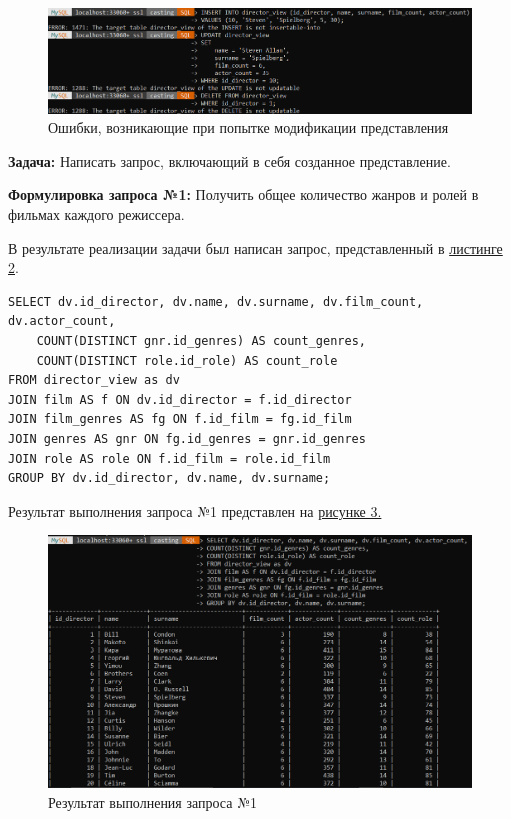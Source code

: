 \documentclass[11pt,a4paper,final]{article} %
\begin{document}
\begin{figure}[H]
	\centering
	\includegraphics[width=0.9\linewidth]{pic2.png}
	\caption{Ошибки, возникающие при попытке модификации представления}
	\label{fig:pic2}
\end{figure}

\textbf{Задача:} Написать запрос, включающий в себя созданное представление.

\textbf{Формулировка запроса №1:} Получить общее количество жанров и ролей в фильмах каждого режиссера.

\par В результате реализации задачи был написан запрос, представленный в \hyperref[lst:l2]{листинге 2}.

\begin{lstlisting}[caption={Код запроса, использующего представление}, label=lst:l2]
SELECT dv.id_director, dv.name, dv.surname, dv.film_count, dv.actor_count, 
	COUNT(DISTINCT gnr.id_genres) AS count_genres,
	COUNT(DISTINCT role.id_role) AS count_role
FROM director_view as dv
JOIN film AS f ON dv.id_director = f.id_director
JOIN film_genres AS fg ON f.id_film = fg.id_film
JOIN genres AS gnr ON fg.id_genres = gnr.id_genres
JOIN role AS role ON f.id_film = role.id_film
GROUP BY dv.id_director, dv.name, dv.surname;
\end{lstlisting}

Результат выполнения запроса №1 представлен на \hyperref[fig:pic3]{рисунке 3.}

\begin{figure}[H]
	\centering
	\includegraphics[width=0.9\linewidth]{pic3.png}
	\caption{Результат выполнения запроса №1}
	\label{fig:pic3}
\end{figure}
\end{document}
